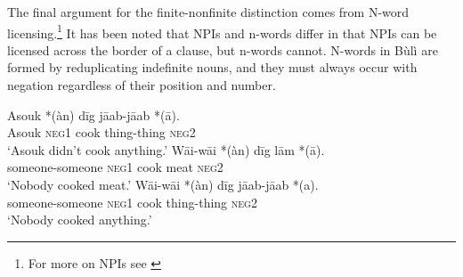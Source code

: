 \documentclass[output=paper,colorlinks,citecolor=brown]{langscibook}
\begin{document}
The final argument for the finite-nonfinite distinction comes from N-word licensing.\footnote{For more on NPIs see \citet{Zeijlstra2017}} 
It has been noted that NPIs and n-words differ in that NPIs can be licensed across the border of a clause, but n-words cannot. 
N-words in Bùlì are formed by reduplicating indefinite nouns, and they must always occur with negation regardless of their position and number.

%
%
%
%

\ea%
    \label{ex:sulemana:14}
    \ea%
    \label{ex:sulemana:14a}
    \gll    Asouk  *(àn)  dīg jāab-jāab  *(ā). \\
            Asouk  \textsc{neg1} cook thing-thing  \textsc{neg2}  \\
    \glt    `Asouk didn't cook anything.' 
    \ex%
    \label{ex:sulemana:14b}
    \gll    Wāi-wāi  *(àn)  dīg lām  *(ā). \\
            someone-someone   \textsc{neg1}  cook meat  \textsc{neg2}  \\
    \glt    `Nobody cooked meat.' 
    \ex%
    \label{ex:sulemana:14c}
    \gll    Wāi-wāi  *(àn)  dīg jāab-jāab  *(a). \\
            someone-someone  \textsc{neg1}  cook thing-thing  \textsc{neg2}  \\
    \glt    `Nobody cooked anything.' 
    \z
\z
\end{document}
